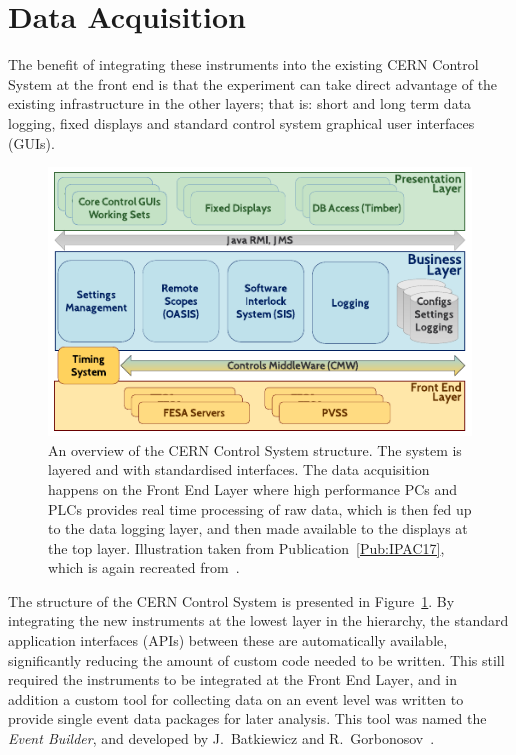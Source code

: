 \section{Data Acquisition}
\label{DAQ:DAQ}

The benefit of integrating these instruments into the existing CERN Control System at the front end is that the experiment can take direct advantage of the existing infrastructure in the other layers; that is: short and long term data logging, fixed displays and standard control system graphical user interfaces (GUIs).

\begin{figure}[hbt]
    \centering
    \includegraphics[width=0.85\linewidth,trim={0mm 0mm 0mm 0mm},clip]{figures/CERNControls}
    \caption{\label{Fig:DAQ:CERN}
        An overview of the CERN Control System structure.
        The system is layered and with standardised interfaces.
        The data acquisition happens on the Front End Layer where high performance PCs and PLCs provides real time processing of raw data, which is then fed up to the data logging layer, and then made available to the displays at the top layer.
        Illustration taken from Publication~\ref{Pub:IPAC17}, which is again recreated from~\cite{add:gorbonosov:2013}.
    }
\end{figure}

The structure of the CERN Control System is presented in Figure~\ref{Fig:DAQ:CERN}.
By integrating the new instruments at the lowest layer in the hierarchy, the standard application interfaces (APIs) between these are automatically available, significantly reducing the amount of custom code needed to be written.
This still required the instruments to be integrated at the Front End Layer, and in addition a custom tool for collecting data on an event level was written to provide single event data packages for later analysis.
This tool was named the \textit{Event Builder}, and developed by J.~Batkiewicz and R.~Gorbonosov~\cite{add:gessner:2018}.

